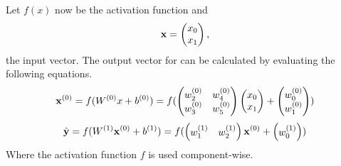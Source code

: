 Let \(f(x)\) now be the activation function and
\begin{equation}
    \mathbf{x} =
    \begin{pmatrix}
        x_0 \\
        x_1
    \end{pmatrix},
\end{equation}
the input vector.
The output vector for  can be calculated by evaluating the following equations.
\begin{equation}
    \mathbf{x}^{(0)} =
    f(W^{(0)}x + b^{(0)}) =
    f(
    \begin{pmatrix}
        w_{2}^{(0)} & w_{4}^{(0)} \\
        w_{3}^{(0)} & w_{5}^{(0)}
    \end{pmatrix}
    \begin{pmatrix}
        x_0 \\
        x_1
    \end{pmatrix}
    +
    \begin{pmatrix}
        w_{0}^{(0)} \\
        w_{1}^{(0)}
    \end{pmatrix}
    )
\end{equation}
\begin{equation}
    \hat{\mathbf{y}} =
    f(W^{(1)}\mathbf{x}^{(0)}+ b^{(1)}) =
    f(
    \begin{pmatrix}
        w_{1}^{(1)} & w_{2}^{(1)}
    \end{pmatrix}
    \mathbf{x}^{(0)}
    +
    \begin{pmatrix}
        w_{0}^{(1)}
    \end{pmatrix}
    )
\end{equation}
Where the activation function \(f\) is used component-wise.